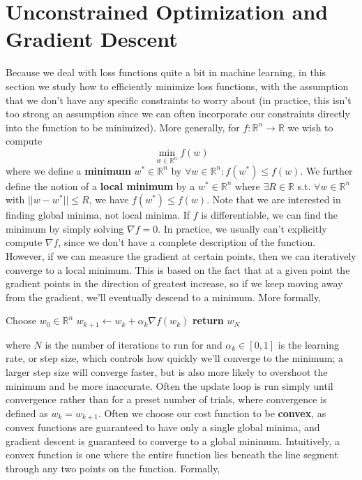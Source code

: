 \documentclass{article}
\begin{document}
\section{Unconstrained Optimization and Gradient Descent}
Because we deal with loss functions quite a bit in machine learning, in this section we study how to efficiently minimize loss functions, with the assumption that we don't have any specific constraints to worry about (in practice, this isn't too strong an assumption since we can often incorporate our constraints directly into the function to be minimized). More generally, for $ f: \mathbb{R}^n \rightarrow \mathbb{R} $ we wish to compute
$$ \min_{w \in \mathbb{R}^n} f(w) $$
where we define a \textbf{minimum} $ w^* \in \mathbb{R}^n $ by $ \forall w \in \mathbb{R}^n: f(w^*) \leq f(w) $. We further define the notion of a \textbf{local minimum} by a $ w^* \in \mathbb{R}^n $ where $ \exists R \in \mathbb{R} $ s.t. $ \forall w \in \mathbb{R}^n $ with $ ||w - w^*|| \leq R $, we have $ f(w^*) \leq f(w) $. Note that we are interested in finding global minima, not local minima.
\newline
If $ f $ is differentiable, we can find the minimum by simply solving $ \nabla f = 0 $. In practice, we usually can't explicitly compute $ \nabla f $, since we don't have a complete description of the function. However, if we can measure the gradient at certain points, then we can iteratively converge to a local minimum. This is based on the fact that at a given point the gradient points in the direction of greatest increase, so if we keep moving away from the gradient, we'll eventually descend to a minimum. More formally,
\begin{algorithmic}
	\State Choose $ w_0 \in \mathbb{R}^n $
		\State $ w_{k + 1} \gets w_k + \alpha_k \nabla f(w_k) $
	\EndFor
	\State \textbf{return} $ w_N $
\EndProcedure
\end{algorithmic}
where $ N $ is the number of iterations to run for and $ \alpha_k \in [0, 1] $ is the learning rate, or step size, which controls how quickly we'll converge to the minimum; a larger step size will converge faster, but is also more likely to overshoot the minimum and be more inaccurate. Often the update loop is run simply until convergence rather than for a preset number of trials, where convergence is defined as $ w_k = w_{k + 1} $.
\newline
Often we choose our cost function to be \textbf{convex}, as convex functions are guaranteed to have only a single global minima, and gradient descent is guaranteed to converge to a global minimum. Intuitively, a convex function is one where the entire function lies beneath the line segment through any two points on the function. Formally,
\end{document}
